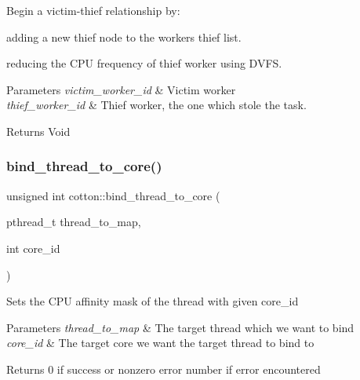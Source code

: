 Begin a victim-\/thief relationship by\+:
\begin{DoxyItemize}
\item adding a new thief node to the worker\textquotesingle{}s thief list.
\item reducing the C\+PU frequency of thief worker using D\+V\+FS.
\end{DoxyItemize}


\begin{DoxyParams}{Parameters}
{\em victim\+\_\+worker\+\_\+id} & Victim worker \\
\hline
{\em thief\+\_\+worker\+\_\+id} & Thief worker, the one which stole the task.\\
\hline
\end{DoxyParams}
\begin{DoxyReturn}{Returns}
Void 
\end{DoxyReturn}
\mbox{\label{cotton-runtime_8h_file_a325b0808848e793c747e547f6e660efd}} 
\subsubsection{\texorpdfstring{bind\+\_\+thread\+\_\+to\+\_\+core()}{bind\_thread\_to\_core()}}
{\footnotesize\ttfamily unsigned int cotton\+::bind\+\_\+thread\+\_\+to\+\_\+core (\begin{DoxyParamCaption}\item[{pthread\+\_\+t}]{thread\+\_\+to\+\_\+map,  }\item[{int}]{core\+\_\+id }\end{DoxyParamCaption})}

Sets the C\+PU affinity mask of the thread with given core\+\_\+id


\begin{DoxyParams}{Parameters}
{\em thread\+\_\+to\+\_\+map} & The target thread which we want to bind \\
\hline
{\em core\+\_\+id} & The target core we want the target thread to bind to \\
\hline
\end{DoxyParams}
\begin{DoxyReturn}{Returns}
0 if success or nonzero error number if error encountered 
\end{DoxyReturn}
\mbox{\label{cotton-runtime_8h_file_a522a9376ec51306eab1724b2a9a1cf93}} 
